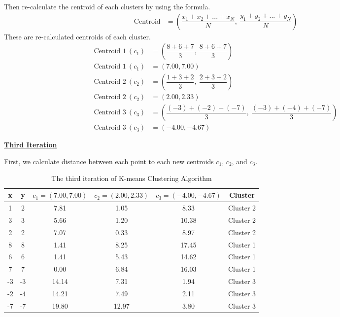 \documentclass[12pt, a4paper]{article}
\begin{document}
\begin{enumerate}
            Then re-calculate the centroid of each clusters by using the formula.
            \begin{align*}
                \text{Centroid} & = \left( \dfrac{x_{1} + x_{2} + ... + x_{N}}{N}, \ \dfrac{y_{1} + y_{2} + ... + y_{N}}{N} \right)
            \end{align*}
            These are re-calculated centroids of each cluster.
            \begin{align*}
                \text{Centroid 1}\ (c_{1}) & = \left( \dfrac{8 + 6 + 7}{3},\ \dfrac{8 + 6 + 7}{3} \right) \\
                \text{Centroid 1}\ (c_{1}) & = (7.00, 7.00) \\[0.75em]
                \text{Centroid 2}\ (c_{2}) & = \left( \dfrac{1 + 3 + 2}{3},\ \dfrac{2 + 3 + 2}{3} \right) \\
                \text{Centroid 2}\ (c_{2}) & = (2.00, 2.33) \\[0.75em]
                \text{Centroid 3}\ (c_{3}) & = \left( \dfrac{(-3) + (-2) + (-7)}{3},\ \dfrac{(-3) + (-4) + (-7)}{3} \right) \\
                \text{Centroid 3}\ (c_{3}) & = (-4.00, -4.67)
            \end{align*}
        \pagebreak

            \underline{\textbf{Third Iteration}}

            First, we calculate distance between each point to each new centroids $c_{1}$, $c_{2}$, and $c_{3}$.
            \begin{table}[h]
                \centering
                \caption{The third iteration of K-means Clustering Algorithm}
                \begin{tabular}{|c|c|c|c|c|c|}
                    \hline
                    \rule{0pt}{2.5ex}
                    x & y & $c_{1} = (7.00, 7.00)$ & $c_{2} = (2.00, 2.33)$ & $c_{3} = (-4.00, -4.67)$ & Cluster \\
                    \hline
                    1 & 2 & 7.81 & 1.05 & 8.33 & Cluster 2 \\
                    3 & 3 & 5.66 & 1.20 & 10.38 & Cluster 2 \\
                    2 & 2 & 7.07 & 0.33 & 8.97 & Cluster 2 \\
                    8 & 8 & 1.41 & 8.25 & 17.45 & Cluster 1 \\
                    6 & 6 & 1.41 & 5.43 & 14.62 & Cluster 1 \\
                    7 & 7 & 0.00 & 6.84 & 16.03 & Cluster 1 \\
                    -3 & -3 & 14.14 & 7.31 & 1.94 & Cluster 3 \\
                    -2 & -4 & 14.21 & 7.49 & 2.11 & Cluster 3 \\
                    -7 & -7 & 19.80 & 12.97 & 3.80 & Cluster 3 \\
                    \hline
                \end{tabular}
            \end{table}


\end{enumerate}
\end{document}

